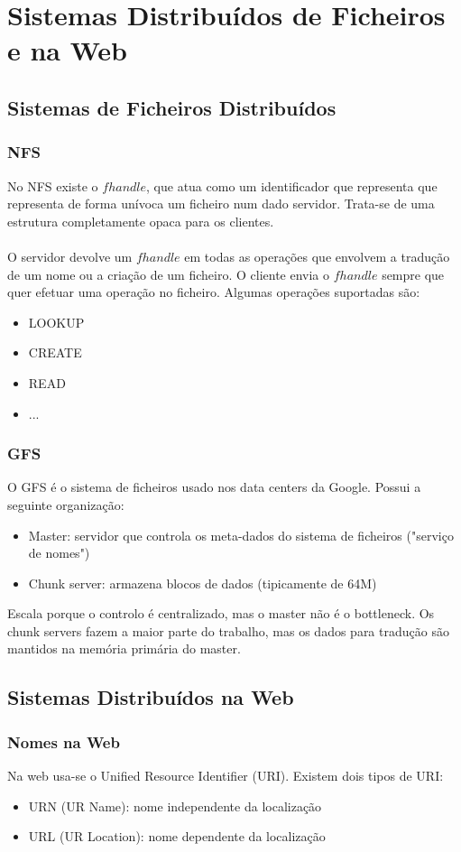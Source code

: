 \documentclass[10pt,a4paper]{report}
\begin{document}
\chapter{Sistemas Distribuídos de Ficheiros e na Web}
\section{Sistemas de Ficheiros Distribuídos}
\subsection{NFS}
No NFS existe o $fhandle$, que atua como um identificador que representa que representa de forma unívoca um ficheiro num dado servidor. Trata-se de uma estrutura completamente opaca para os clientes.\\
\\
O servidor devolve um $fhandle$ em todas as operações que envolvem a tradução de um nome ou a criação de um ficheiro. O cliente envia o $fhandle$ sempre que quer efetuar uma operação no ficheiro. Algumas operações suportadas são:
\begin{itemize}
\item LOOKUP
\item CREATE
\item READ
\item ...
\end{itemize}
\subsection{GFS}
O GFS é o sistema de ficheiros usado nos data centers da Google. Possui a seguinte organização:
\begin{itemize}
\item Master: servidor que controla os meta-dados do sistema de ficheiros ("serviço de nomes")
\item Chunk server: armazena blocos de dados (tipicamente de 64M)
\end{itemize}
Escala porque o controlo é centralizado, mas o master não é o bottleneck. Os chunk servers fazem a maior parte do trabalho, mas os dados para tradução são mantidos na memória primária do master.
\section{Sistemas Distribuídos na Web}
\subsection{Nomes na Web}
Na web usa-se o Unified Resource Identifier (URI). Existem dois tipos de URI:
\begin{itemize}
\item URN (UR Name): nome independente da localização
\item URL (UR Location): nome dependente da localização
\end{itemize}
\end{document}
